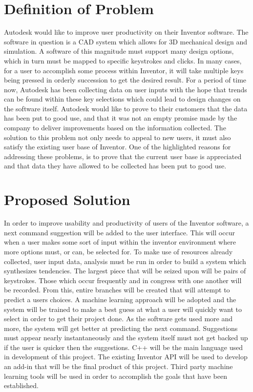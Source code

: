 \documentclass[onecolumn, draftclsnofoot,10pt, compsoc]{IEEEtran}
\begin{document}
\section{Definition of Problem}

Autodesk would like to improve user productivity on their Inventor software. The software in question is a CAD system which allows for 3D mechanical design and simulation. A software of this magnitude must support many design options, which in turn must be mapped to specific keystrokes and clicks. In many cases, for a user to accomplish some process within Inventor, it will take multiple keys being pressed in orderly succession to get the desired result. For a period of time now, Autodesk has been collecting data on user inputs with the hope that trends can be found within these key selections which could lead to design changes on the software itself. Autodesk would like to prove to their customers that the data has been put to good use, and that it was not an empty promise made by the company to deliver improvements based on the information collected. The solution to this problem not only needs to appeal to new users, it must also satisfy the existing user base of Inventor. One of the highlighted reasons for addressing these problems, is to prove that the current user base is appreciated and that data they have allowed to be collected has been put to good use. 

\section{Proposed Solution}

In order to improve usability and productivity of users of the Inventor software, a next command suggestion will be added to the user interface. This will occur when a user makes some sort of input within the inventor environment where more options must, or can, be selected for. To make use of resources already collected, user input data, analysis must be run in order to build a system which synthesizes tendencies. The largest piece that will be seized upon will be pairs of keystrokes. Those which occur frequently and in congress with one another will be recorded. From this, entire branches will be created that will attempt to predict a users choices. A machine learning approach will be adopted and the system will be trained to make a best guess at what a user will quickly want to select in order to get their project done. As the software gets used more and more, the system will get better at predicting the next command. Suggestions must appear nearly instantaneously and the system itself must not get backed up if the user is quicker then the suggestions. C++ will be the main language used in development of this project. The existing Inventor API will be used to develop an add-in that will be the final product of this project. Third party machine learning tools will be used in order to accomplish the goals that have been established. 
\end{document}
